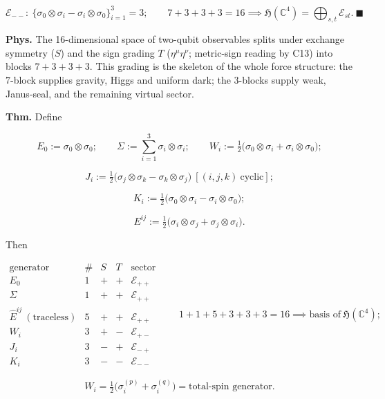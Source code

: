 \begin{theorem}
\[
\mathcal E_{--}:\ \{\sigma_0\otimes\sigma_i-\sigma_i\otimes\sigma_0\}_{i=1}^{3}=3;\qquad
7+3+3+3=16\implies\mathfrak H(\mathbb C^4)=\bigoplus_{s,t}\mathcal E_{st}.\ \blacksquare
\]

\textbf{Phys.} The 16-dimensional space of two-qubit observables splits under exchange symmetry ($S$) and the sign grading $T$ ($\eta^\mu\eta^\nu$; metric-sign reading by C13) into blocks $7+3+3+3$. This grading is the skeleton of the whole force structure: the $7$-block supplies gravity, Higgs and uniform dark; the $3$-blocks supply weak, Janus-seal, and the remaining virtual sector.

\end{theorem}

\begin{theorem}\label{tag:CT1-2}
\textbf{Thm.} Define

\[
E_0:=\sigma_0\otimes\sigma_0;\qquad
\Sigma:=\textstyle\sum_{i=1}^{3}\sigma_i\otimes\sigma_i;\qquad
W_i:=\tfrac12\bigl(\sigma_0\otimes\sigma_i+\sigma_i\otimes\sigma_0\bigr);
\]

\[
J_i:=\tfrac12\bigl(\sigma_j\otimes\sigma_k-\sigma_k\otimes\sigma_j\bigr)\ [(i,j,k)\ \text{cyclic}];
\]

\[
\qquad K_i:=\tfrac12\bigl(\sigma_0\otimes\sigma_i-\sigma_i\otimes\sigma_0\bigr);
\]

\[
\qquad E^{ij}:=\tfrac12\bigl(\sigma_i\otimes\sigma_j+\sigma_j\otimes\sigma_i\bigr).
\]

Then

\[
\begin{array}{c|c|c|c|c}
\text{generator} & \# & S & T & \text{sector}\\ \hline
E_0 & 1 & + & + & \mathcal E_{++}\\
\Sigma & 1 & + & + & \mathcal E_{++}\\
\hat E^{ij}\ (\text{traceless}) & 5 & + & + & \mathcal E_{++}\\
W_i & 3 & + & - & \mathcal E_{+-}\\
J_i & 3 & - & + & \mathcal E_{-+}\\
K_i & 3 & - & - & \mathcal E_{--}
\end{array}
\qquad 1+1+5+3+3+3=16\implies\text{basis of}\ \mathfrak H(\mathbb C^4);
\]

\[
W_i=\tfrac12\bigl(\sigma_i^{(p)}+\sigma_i^{(q)}\bigr)=\text{total-spin generator}.
\]


\end{theorem}
